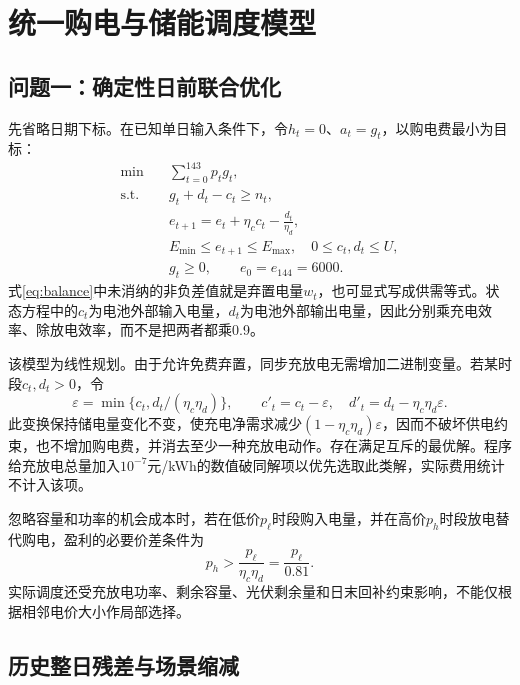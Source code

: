 \section{统一购电与储能调度模型}

\subsection{问题一：确定性日前联合优化}

先省略日期下标。在已知单日输入条件下，令$h_t=0$、$a_t=g_t$，以购电费最小为目标：
\begin{align}
 \min\quad &\sum_{t=0}^{143}p_tg_t,\label{eq:q1_objective}\\
 \text{s.t.}\quad &g_t+d_t-c_t\ge n_t,\label{eq:balance}\\
 &e_{t+1}=e_t+\eta_cc_t-\frac{d_t}{\eta_d},\label{eq:soc}\\
 &E_{\min}\le e_{t+1}\le E_{\max},\quad 0\le c_t,d_t\le U,\label{eq:limits}\\
 &g_t\ge0,\qquad e_0=e_{144}=6000.\label{eq:terminal_q1}
\end{align}
式\eqref{eq:balance}中未消纳的非负差值就是弃置电量$w_t$，也可显式写成供需等式。状态方程中的$c_t$为电池外部输入电量，$d_t$为电池外部输出电量，因此分别乘充电效率、除放电效率，而不是把两者都乘0.9。

该模型为线性规划。由于允许免费弃置，同步充放电无需增加二进制变量。若某时段$c_t,d_t>0$，令
\begin{equation}
 \varepsilon=\min\{c_t,d_t/(\eta_c\eta_d)\},\qquad
 c'_t=c_t-\varepsilon,\quad d'_t=d_t-\eta_c\eta_d\varepsilon.
\end{equation}
此变换保持储电量变化不变，使充电净需求减少$(1-\eta_c\eta_d)\varepsilon$，因而不破坏供电约束，也不增加购电费，并消去至少一种充放电动作。存在满足互斥的最优解。程序给充放电总量加入$10^{-7}$元/kWh的数值破同解项以优先选取此类解，实际费用统计不计入该项。

忽略容量和功率的机会成本时，若在低价$p_{\ell}$时段购入电量，并在高价$p_h$时段放电替代购电，盈利的必要价差条件为
\begin{equation}
 p_h>\frac{p_{\ell}}{\eta_c\eta_d}=\frac{p_{\ell}}{0.81}.
 \label{eq:arbitrage}
\end{equation}
实际调度还受充放电功率、剩余容量、光伏剩余量和日末回补约束影响，不能仅根据相邻电价大小作局部选择。

\subsection{历史整日残差与场景缩减}

